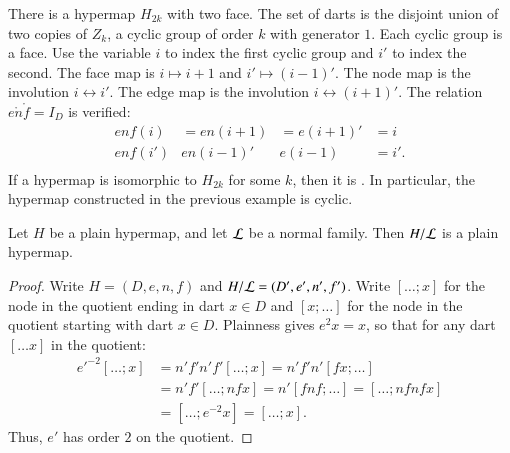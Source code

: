 \begin{example}[cyclic]\label{ex:H2k} 
There is a hypermap $H_{2k}$ with two face.  The set of darts is the
disjoint union of two copies of $Z_k$, a cyclic group of order $k$
with generator $1$.  Each cyclic group is a face.  Use the variable
$i$ to index the first cyclic group and $i'$ to index the second.
The face map is $i\mapsto i+1$ and $i'\mapsto (i-1)'$.  The node map
is the involution $i\leftrightarrow i'$.  The edge map is the
involution $i\leftrightarrow (i+1)'$.  The relation $e\ocirc n\ocirc
f = I_D$ is verified:
\begin{displaymath}
\begin{array}{llllllll}
enf(i) &= e n(i+1) &= e(i+1)' &= i\\
e n f (i') & e n (i-1)' & e (i-1) &= i'.\\
\end{array}
\end{displaymath}
If a hypermap is isomorphic to $H_{2k}$ for
some $k$, then it is .  In particular,
the hypermap constructed in the previous example is cyclic.
%
%
\end{example}

\begin{lemma}
Let $H$ be a plain hypermap, and let $\cal L$ be a
normal family.  Then $H/{\cal L}$ is a plain hypermap.
\end{lemma}

\begin{proof}  Write $H=(D,e,n,f)$ and $H/{\cal L} = (D',e',n',f')$.  
Write $[\ldots; x]$ for the node in
the quotient ending in dart $x\in D$ and $[x;\ldots]$ for the node
in the quotient starting with dart $x\in D$.  Plainness gives $e^2 x
= x$, so that for any dart $[\ldots x]$ in the quotient:
\begin{displaymath}\begin{array}{lll}
{e'}^{-2} [\ldots; x] &= n' f' n' f' [\ldots; x] = n' f' n' [f x; \ldots] \\&=
n' f' [\ldots; n f x] = n' [f n f; \ldots] = [\ldots; n f n f x]\\ &=
[\ldots; e^{-2} x] = [\ldots; x].
\end{array}\end{displaymath}
Thus, $e'$ has order $2$ on the quotient.
\end{proof}



